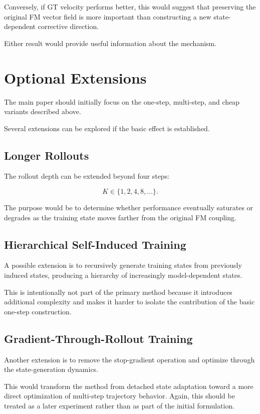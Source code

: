 \documentclass[11pt]{article}
\begin{document}
Conversely, if GT velocity performs better, this would suggest that preserving
the original FM vector field is more important than constructing a new
state-dependent corrective direction.

Either result would provide useful information about the mechanism.

\section{Optional Extensions}

The main paper should initially focus on the one-step, multi-step, and cheap
variants described above.

Several extensions can be explored if the basic effect is established.

\subsection{Longer Rollouts}

The rollout depth can be extended beyond four steps:

\begin{equation}
K\in\{1,2,4,8,\ldots\}.
\end{equation}

The purpose would be to determine whether performance eventually saturates or
degrades as the training state moves farther from the original FM coupling.

\subsection{Hierarchical Self-Induced Training}

A possible extension is to recursively generate training states from previously
induced states, producing a hierarchy of increasingly model-dependent states.

This is intentionally not part of the primary method because it introduces
additional complexity and makes it harder to isolate the contribution of the
basic one-step construction.

\subsection{Gradient-Through-Rollout Training}

Another extension is to remove the stop-gradient operation and optimize through
the state-generation dynamics.

This would transform the method from detached state adaptation toward a more
direct optimization of multi-step trajectory behavior. Again, this should be
treated as a later experiment rather than as part of the initial formulation.
\end{document}
